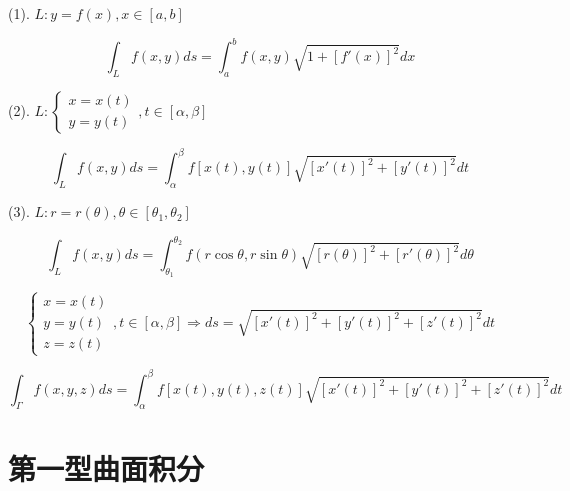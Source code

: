 \begin{theorem}[平面曲线]
	
	(1). $L: y=f(x), x\in[a,b]$
	
	$$\int_{L}f(x,y)ds=\int_{a}^{b}f(x,y)\sqrt{1+[f'(x)]^2}dx$$
	
	(2). $L: \begin{cases}
		x = x(t)\\
		y = y(t)
	\end{cases}, t\in[\alpha,\beta]$
	
	$$\int_{L}f(x,y)ds=\int_{\alpha}^{\beta}f\left[x(t),y(t)\right]\sqrt{[x'(t)]^2+[y'(t)]^2}dt$$
	
	(3). $L: r=r(\theta), \theta\in[\theta_{1},\theta_{2}]$
	
	$$\int_{L}f(x,y)ds=\int_{\theta_{1}}^{\theta_{2}}f(r\cos \theta,r\sin\theta)\sqrt{[r(\theta)]^2+[r'(\theta)]^2}d\theta$$
\end{theorem}
\begin{theorem}[空间曲线]
	
	$$\begin{cases}
		x = x(t)\\
		y = y(t)\\
		z = z(t)
	\end{cases}, t\in[\alpha,\beta]\Rightarrow 
	ds=\sqrt{[x'(t)]^{2}+[y'(t)]^{2}+[z'(t)]^{2}}dt$$
	
	$$\int_{\Gamma}f(x,y,z)ds=\int_{\alpha}^{\beta}f \left[ x(t),y(t),z(t)\right]\sqrt{[x'(t)]^{2}+[y'(t)]^{2}+[z'(t)]^{2}}dt$$
\end{theorem}

\section{第一型曲面积分}
